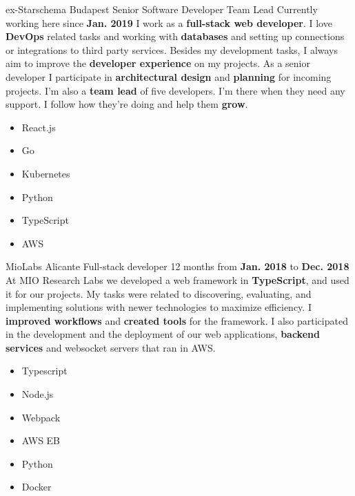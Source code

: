 
\workentry
    {ex-Starschema}
    {Budapest}
    {Senior Software Developer Team Lead}
    {Currently working here since \textbf{Jan. 2019}}
    {}
    {I work as a \textbf{full-stack web developer}. I love \textbf{DevOps} related tasks and working with \textbf{databases}
    and setting up connections or integrations to third party services.
    Besides my development tasks, I always aim to improve the \textbf{developer experience} on my projects.
    As a senior developer I participate in \textbf{architectural design} and \textbf{planning} for incoming projects.
    I'm also a \textbf{team lead} of five developers. I'm there when they need any support.
    I follow how they're doing and help them \textbf{grow}.}
    {\vspace{-\baselineskip}
    \begin{multicols}{3}
    \begin{itemize}
        \item React.js
        \item Go
        \item Kubernetes
        \item Python
        \item TypeScript
        \item AWS
    \end{itemize}
    \end{multicols}}
%
\workentry
    {MioLabs}
    {Alicante}
    {Full-stack developer}
    {12 months from \textbf{Jan. 2018} to \textbf{Dec. 2018}}
    {}
    {%
    At MIO Research Labs we developed a web framework in \textbf{TypeScript}, and used it for our projects. My tasks were related to discovering, evaluating, and implementing solutions with newer technologies to maximize efficiency. I \textbf{improved workflows} and \textbf{created tools} for the framework. I also participated in the development and the deployment of our web applications, \textbf{backend services} and websocket servers that ran in AWS.
    }
    {\vspace{-\baselineskip}
    \begin{multicols}{3}
    \begin{itemize}
        \item \small{Typescript}
        \item \small{Node.js}
        \item \small{Webpack}
        \item \small{AWS EB}
        \item \small{Python}
        \item \small{Docker}
    \end{itemize}
    \end{multicols}}
